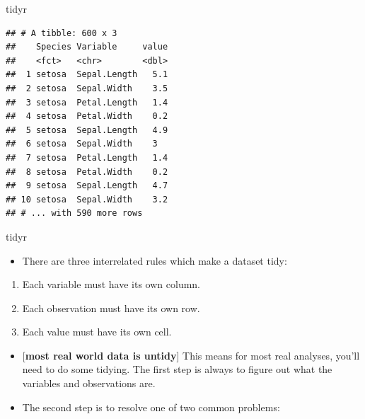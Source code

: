 \documentclass[ignorenonframetext,]{beamer}
\providecommand{\tightlist}{%
  \setlength{\itemsep}{0pt}\setlength{\parskip}{0pt}}
\begin{document}
\begin{frame}[fragile]{tidyr}
\protect\hypertarget{tidyr-2}{}

\begin{verbatim}
## # A tibble: 600 x 3
##    Species Variable     value
##    <fct>   <chr>        <dbl>
##  1 setosa  Sepal.Length   5.1
##  2 setosa  Sepal.Width    3.5
##  3 setosa  Petal.Length   1.4
##  4 setosa  Petal.Width    0.2
##  5 setosa  Sepal.Length   4.9
##  6 setosa  Sepal.Width    3  
##  7 setosa  Petal.Length   1.4
##  8 setosa  Petal.Width    0.2
##  9 setosa  Sepal.Length   4.7
## 10 setosa  Sepal.Width    3.2
## # ... with 590 more rows
\end{verbatim}

\end{frame}

\begin{frame}[fragile]{tidyr}
\protect\hypertarget{tidyr-3}{}

\begin{itemize}
\tightlist
\item
  There are three interrelated rules which make a dataset tidy:
\end{itemize}

\begin{enumerate}
\tightlist
\item
  Each variable must have its own column.
\item
  Each observation must have its own row.
\item
  Each value must have its own cell.
\end{enumerate}

\begin{itemize}
\item
  {[}\textbf{most real world data is untidy}{]} This means for most real
  analyses, you'll need to do some tidying. The first step is always to
  figure out what the variables and observations are.
\item
  The second step is to resolve one of two common problems:


\end{itemize}
\end{frame}
\end{document}
